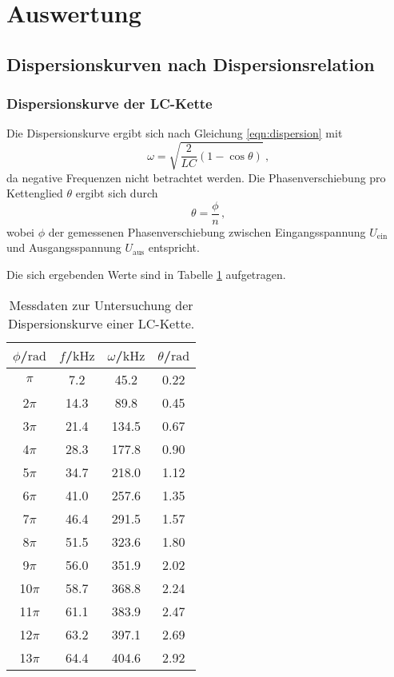 \section{Auswertung}
\label{sec:Auswertung}

\FloatBarrier
\subsection{Dispersionskurven nach Dispersionsrelation}

\subsubsection{Dispersionskurve der LC-Kette}
Die Dispersionskurve ergibt sich nach Gleichung \eqref{eqn:dispersion} mit
\begin{equation}
	\label{eqn:dispisi}
	\omega = \sqrt{\frac{2}{LC}(1-\cos\theta)} \, \text{,}
\end{equation}
da negative Frequenzen nicht betrachtet werden.
Die Phasenverschiebung pro Kettenglied $\theta$ ergibt sich durch
\begin{equation}
	\theta = \frac{\phi}{n} \, \text{,}
\end{equation}
wobei $\phi$ der gemessenen Phasenverschiebung zwischen Eingangsspannung $U_{\text{ein}}$
und Ausgangsspannung $U_{\text{aus}}$ entspricht.

Die sich ergebenden Werte sind in Tabelle \ref{tab:dispersionlc} aufgetragen.

\begin{table}
	\caption{Messdaten zur Untersuchung der Dispersionskurve einer LC-Kette.}
	\label{tab:dispersionlc}
	\centering
	\begin{tabular}{cccc}
	\toprule
	$\phi$/$\si{\radian}$ & $f$/$\si{\kilo\Hz}$ & $\omega$/$\si{\kilo\Hz}$ & $\theta$/$\si{\radian}$ \\
	\midrule
		$\pi$ & 7.2 & 45.2 & 0.22 \\
		2$\pi$ & 14.3 & 89.8 & 0.45 \\
		3$\pi$ & 21.4 & 134.5 & 0.67 \\
		4$\pi$ & 28.3 & 177.8 & 0.90 \\
		5$\pi$ & 34.7 & 218.0 & 1.12 \\
		6$\pi$ & 41.0 & 257.6 & 1.35 \\
		7$\pi$ & 46.4 & 291.5 & 1.57 \\
		8$\pi$ & 51.5 & 323.6 & 1.80 \\
		9$\pi$ & 56.0 & 351.9 & 2.02 \\
		10$\pi$ & 58.7 & 368.8 & 2.24 \\
		11$\pi$ & 61.1 & 383.9 & 2.47 \\
		12$\pi$ & 63.2 & 397.1 & 2.69 \\
		13$\pi$ & 64.4 & 404.6 & 2.92 \\
	\bottomrule
	\end{tabular}
\end{table}

